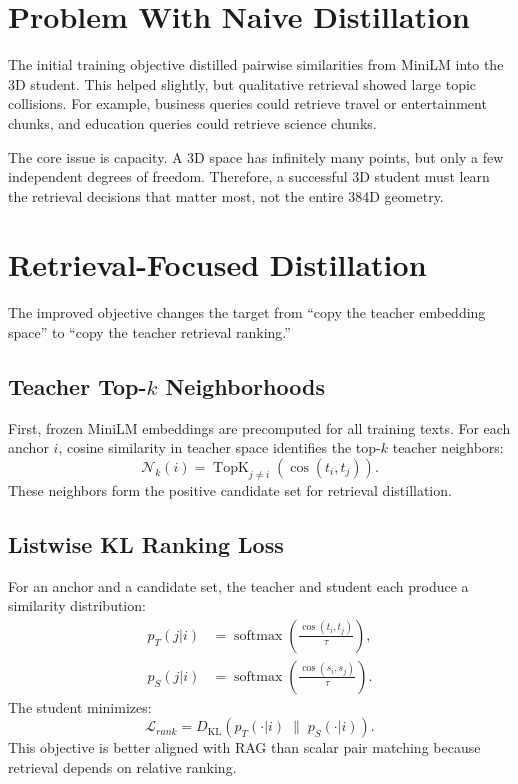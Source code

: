 \documentclass[11pt]{article}
\begin{document}
\section{Problem With Naive Distillation}
The initial training objective distilled pairwise similarities from MiniLM into the 3D student. This helped slightly, but qualitative retrieval showed large topic collisions. For example, business queries could retrieve travel or entertainment chunks, and education queries could retrieve science chunks.

The core issue is capacity. A 3D space has infinitely many points, but only a few independent degrees of freedom. Therefore, a successful 3D student must learn the retrieval decisions that matter most, not the entire 384D geometry.

\section{Retrieval-Focused Distillation}
The improved objective changes the target from ``copy the teacher embedding space'' to ``copy the teacher retrieval ranking.''

\subsection{Teacher Top-$k$ Neighborhoods}
First, frozen MiniLM embeddings are precomputed for all training texts. For each anchor $i$, cosine similarity in teacher space identifies the top-$k$ teacher neighbors:
\[
\mathcal{N}_k(i) = \operatorname{TopK}_{j\ne i}
\left(
\cos(t_i,t_j)
\right).
\]
These neighbors form the positive candidate set for retrieval distillation.

\subsection{Listwise KL Ranking Loss}
For an anchor and a candidate set, the teacher and student each produce a similarity distribution:
\begin{align}
p_T(j|i) &= \operatorname{softmax}\left(\frac{\cos(t_i,t_j)}{\tau}\right),\\
p_S(j|i) &= \operatorname{softmax}\left(\frac{\cos(s_i,s_j)}{\tau}\right).
\end{align}
The student minimizes:
\[
\mathcal{L}_{rank} =
D_{\mathrm{KL}}\left(p_T(\cdot|i)\;\|\;p_S(\cdot|i)\right).
\]
This objective is better aligned with RAG than scalar pair matching because retrieval depends on relative ranking.
\end{document}
